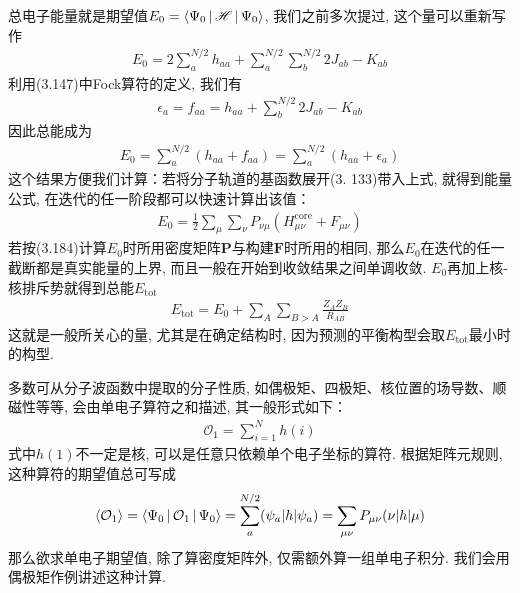总电子能量就是期望值$E_0 = \Braket{\Psi_0|\mathscr{H}|\Psi_0}$, 
我们之前多次提过, 
这个量可以重新写作
\begin{align}
	E_0 =2\sum_a^{N/2}h_{aa} + \sum_a^{N/2}\sum_b^{N/2}2J_{ab}-K_{ab}
\end{align}
利用(3.147)中Fock算符的定义, 
我们有
\begin{align}
	\epsilon_a = f_{aa} = h_{aa} + \sum_b^{N/2}2J_{ab} - K_{ab}
\end{align}
因此总能成为
\begin{align}
	E_0 = \sum_{a}^{N/2}(h_{aa}+f_{aa}) = \sum_{a}^{N/2}(h_{aa}+\epsilon_a)
\end{align}
这个结果方便我们计算：若将分子轨道的基函数展开(3.
133)带入上式, 
就得到能量公式, 
在迭代的任一阶段都可以快速计算出该值：
\begin{align}
	\label{3.184}
	E_0 = \frac{1}{2}\sum_\mu\sum_\nu P_{\nu\mu}(H_{\mu\nu}^\mathrm{core}+F_{\mu\nu})
\end{align}
若按(3.184)计算$E_0$时所用密度矩阵$\mathbf{P}$与构建$\mathbf{F}$时所用的相同, 
那么$E_0$在迭代的任一截断都是真实能量的上界, 
而且一般在开始到收敛结果之间单调收敛. 
$E_0$再加上核-核排斥势就得到总能$E_\mathrm{tot}$
\begin{align}
	E_\mathrm{tot} = E_0 + \sum_{A}\sum_{B>A}\frac{Z_AZ_B}{R_{AB}}
\end{align}
这就是一般所关心的量, 
尤其是在确定结构时, 
因为预测的平衡构型会取$E_\mathrm{tot}$最小时的构型.


多数可从分子波函数中提取的分子性质, 
如偶极矩、四极矩、核位置的场导数、顺磁性等等, 
会由单电子算符之和描述, 
其一般形式如下：
\begin{align}
	\mathcal{O}_1 = \sum_{i=1}^{N}h(i)
\end{align}
式中$h(1)$不一定是核\ha, 
可以是任意只依赖单个电子坐标的算符. 
根据矩阵元规则, 
这种算符的期望值总可写成
\begin{align}
	\Braket{\mathcal{O}_1} = \Braket{\Psi_0|\mathcal{O}_1|\Psi_0} = \sum_{a}^{N/2}(\psi_a|h|\psi_a) = \sum_{\mu\nu}P_{\mu\nu}(\nu|h|\mu)
\end{align}
那么欲求单电子期望值, 
除了算密度矩阵外, 
仅需额外算一组单电子积分. 
我们会用偶极矩作例讲述这种计算. 


